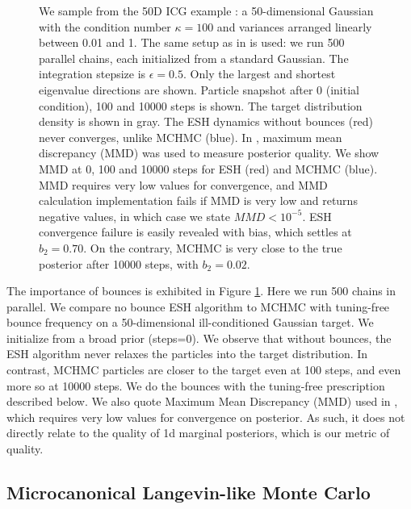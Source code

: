 \documentclass[twoside,11pt]{article}
\begin{document}
\begin{figure}
    \caption{We sample from the 50D ICG example \citep{ESH}: a 50-dimensional Gaussian with the condition number $\kappa = 100$ and variances arranged linearly between 0.01 and 1. The same setup as in \cite{ESH} is used: we run 500 parallel chains, each initialized from a standard Gaussian. The integration stepsize is $\epsilon = 0.5$. Only the largest and shortest eigenvalue directions are shown. Particle snapshot after 0 (initial condition), 100 and 10000 steps is shown. The target distribution density is shown in gray. The ESH dynamics without bounces (red) never converges, unlike MCHMC (blue). In \cite{ESH}, maximum mean discrepancy (MMD) was used to measure posterior quality. We show MMD at 0, 100 and 10000 steps for ESH (red) and MCHMC (blue). MMD requires very low values for convergence, and MMD calculation implementation \citep{ESH} fails if MMD is very low and returns negative values, in which case we state $MMD < 10^{-5}$. ESH convergence failure is easily revealed with bias, which settles at $b_2 = 0.70$. On the contrary, MCHMC is very close to the true posterior after 10000 steps, with $b_2 = 0.02$.} 
    \label{fig: ESHexample}
\end{figure}

The importance of bounces is exhibited
in Figure \ref{fig: ESHexample}. Here 
we run 500 chains in parallel. We 
compare no bounce ESH algorithm \citep{ESH} to MCHMC with tuning-free bounce
frequency on a 50-dimensional 
ill-conditioned Gaussian target. 
We initialize from a broad prior (steps=0). We observe that without bounces, the ESH algorithm never relaxes
the particles into the target distribution. 
In contrast, MCHMC particles are closer to the target even at 100 steps, 
and even more so at 10000 steps. We do the bounces with the tuning-free prescription
described below.
We also quote Maximum Mean Discrepancy (MMD) used in \cite{ESH}, which requires very low values
for convergence on posterior.
As such, it does not directly relate to the quality of 1d marginal posteriors, which is 
our metric of quality. 




\subsection{Microcanonical Langevin-like Monte Carlo} \label{sec: MLMC}
\end{document}
